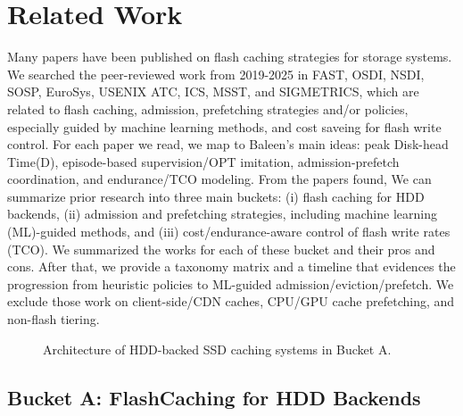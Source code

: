\section{Related Work}

Many papers have been published on flash caching strategies for storage systems. We searched the peer-reviewed work from 2019-2025 in FAST, OSDI, NSDI, SOSP, EuroSys, USENIX ATC, ICS, MSST, and SIGMETRICS, which are related to flash caching, admission, prefetching strategies and/or policies, especially guided by machine learning methods, and cost saveing for flash write control. For each paper we read, we map to Baleen's main ideas: peak Disk-head Time(D), episode-based supervision/OPT imitation, admission-prefetch coordination, and endurance/TCO modeling. From the papers found, We can summarize prior research into three main buckets: 
(i) flash caching for HDD backends,
(ii) admission and prefetching strategies, including machine learning (ML)-guided methods,
and (iii) cost/endurance-aware control of flash write rates (TCO).
We summarized the works for each of these bucket and their pros and cons. After that, we provide a taxonomy matrix and a timeline that evidences the progression from heuristic policies to ML-guided admission/eviction/prefetch. 
We exclude those work on client-side/CDN caches, CPU/GPU cache prefetching, and non-flash tiering. 

\begin{figure}[!htb]
  \centering
  
  \caption{Architecture of HDD-backed SSD caching systems in Bucket A.}
  \label{fig:bucketA_arch}
\end{figure}

\subsection{Bucket A: FlashCaching for HDD Backends}
